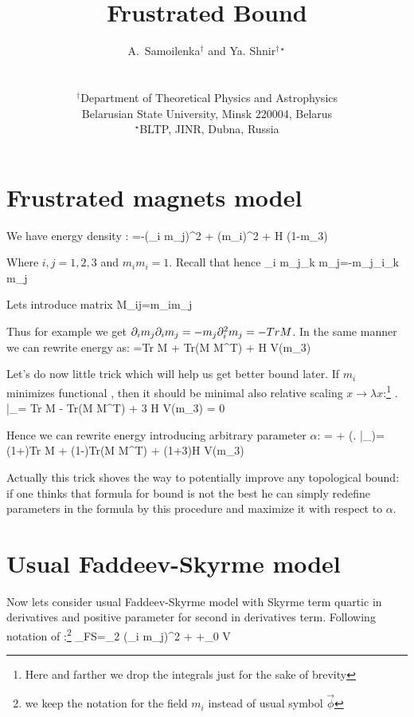 \documentclass[12pt,a4paper]{article}
\title{Frustrated Bound}
\author{
    {\large A.~Samoilenka}$^{\dagger}$
    and {\large Ya. Shnir}$^{\dagger \star}$
    \\ \\
    \\ $^{\dagger}${\small Department of Theoretical Physics and Astrophysics}\\
    {\small Belarusian State University, Minsk 220004, Belarus}
    \\ $^{\star}${\small BLTP, JINR, Dubna, Russia}
}
\begin{document}
\maketitle

\begin{abstract}

\end{abstract}

\section{Frustrated magnets model}
We have energy density \cite{Sutcliffe:2017aro}:
\be\label{energy}
\CE=-(\pa_i m_j)^2 + (\Delta m_i)^2 + H (1-m_3)
\ee 

Where $i,j=1,2,3$ and $m_i m_i=1$. Recall that hence 
\be\label{ort}
\pa_i m_j\pa_k m_j=-m_j\pa_i\pa_k m_j
\ee

Lets introduce matrix
\be\label{matrix}
M_{ij}=m_i\Delta m_j
\ee

Thus for example we get $\partial_i m_j\partial_i m_j=-m_j\partial_i^2 m_j=-Tr M$. In the same manner we can rewrite energy as:
\be
\CE=Tr M + Tr(M M^T) + H V(m_3)
\ee

Let's do now little trick which will help us get better bound later. If $m_i$ minimizes functional , then it should be minimal also relative scaling $x\rightarrow\lambda x$:\footnote{Here and farther we drop the integrals just for the sake of brevity}
\be
\left. \right|_{}= Tr M - Tr(M M^T) + 3 H V(m_3) = 0
\ee

Hence we can rewrite energy introducing arbitrary parameter $\alpha$:
\be\label{trick}
\CE= \CE + \alpha\left(\left. \right|_{}\right)= (1+\alpha)Tr M + (1-\alpha)Tr(M M^T) + (1+3\alpha)H V(m_3)
\ee

Actually this trick shoves the way to potentially improve any topological bound: if one thinks that formula for bound is not the best he can simply redefine parameters in the formula by this procedure and maximize it with respect to $\alpha$. 

\section{Usual Faddeev-Skyrme model}
Now lets consider usual Faddeev-Skyrme model with Skyrme term quartic in derivatives and positive parameter for second in derivatives term. Following notation of \cite{harland}:\footnote{we keep the notation for the field $m_i$ instead of usual symbol $\vec \phi$}
\be
\CE_{FS}=\alpha_2 (\pa_i m_j)^2 + \left[ (\pa_i m_j \pa_i m_j)^2 - \pa_i m_k \pa_j m_k \pa_j m_n \pa_i m_n \right]+\alpha_0 V
\ee
\end{document}
